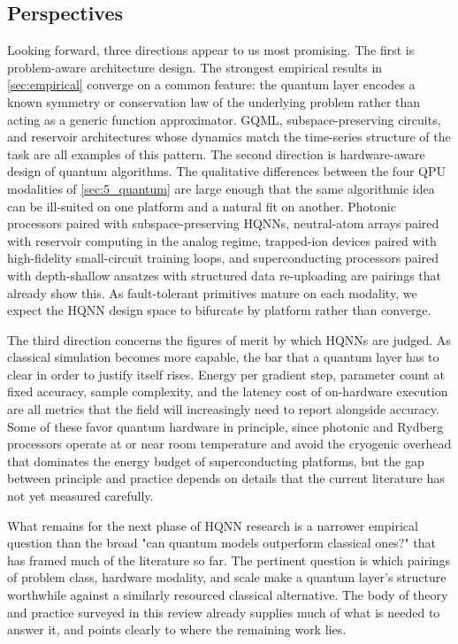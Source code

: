 \documentclass[aps,10pt,groupedaddress,prx,superscriptaddress,twocolumn,balancelastpage, tightenlines]{revtex4-2}
\theoremstyle{plain}  %
\begin{document}
\subsection{Perspectives}

Looking forward, three directions appear to us most promising. The first is problem-aware architecture design. The strongest empirical results in \autoref{sec:empirical} converge on a common feature: the quantum layer encodes a known symmetry or conservation law of the underlying problem rather than acting as a generic function approximator. \gls{GQML}, subspace-preserving circuits, and reservoir architectures whose dynamics match the time-series structure of the task are all examples of this pattern. The second direction is hardware-aware design of quantum algorithms. The qualitative differences between the four \gls{QPU} modalities of \autoref{sec:5_quantum} are large enough that the same algorithmic idea can be ill-suited on one platform and a natural fit on another. Photonic processors paired with subspace-preserving \glspl{HQNN}, neutral-atom arrays paired with reservoir computing in the analog regime, trapped-ion devices paired with high-fidelity small-circuit training loops, and superconducting processors paired with depth-shallow ansatzes with structured data re-uploading are pairings that already show this. As fault-tolerant primitives mature on each modality, we expect the \gls{HQNN} design space to bifurcate by platform rather than converge.

The third direction concerns the figures of merit by which \glspl{HQNN} are judged. As classical simulation becomes more capable, the bar that a quantum layer has to clear in order to justify itself rises. Energy per gradient step, parameter count at fixed accuracy, sample complexity, and the latency cost of on-hardware execution are all metrics that the field will increasingly need to report alongside accuracy. Some of these favor quantum hardware in principle, since photonic and Rydberg processors operate at or near room temperature and avoid the cryogenic overhead that dominates the energy budget of superconducting platforms, but the gap between principle and practice depends on details that the current literature has not yet measured carefully.

What remains for the next phase of \gls{HQNN} research is a narrower empirical question than the broad "can quantum models outperform classical ones?" that has framed much of the literature so far. The pertinent question is which pairings of problem class, hardware modality, and scale make a quantum layer's structure worthwhile against a similarly resourced classical alternative. The body of theory and practice surveyed in this review already supplies much of what is needed to answer it, and points clearly to where the remaining work lies.


%



\end{document}

